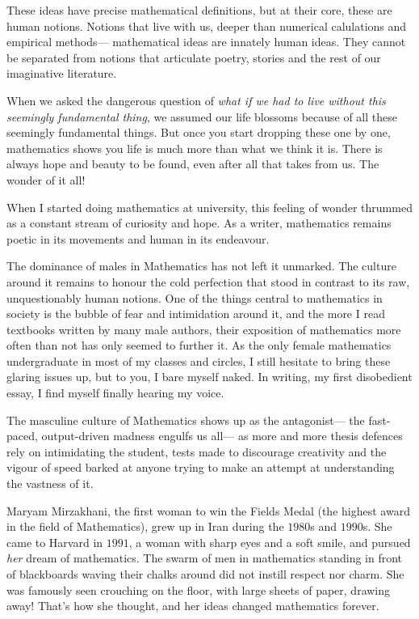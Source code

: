 \documentclass[11pt, letterpaper]{article}
\begin{document}
These ideas have precise mathematical definitions, but at their core, these are human notions. Notions that live with us, deeper than numerical calulations and empirical methods--- mathematical ideas are innately human ideas. They cannot be separated from notions that articulate poetry, stories and the rest of our imaginative literature. 

When we asked the dangerous question of \textit{what if we had to live without this seemingly fundamental thing}, we assumed our life blossoms because of all these seemingly fundamental things. But once you start dropping these one by one, mathematics shows you life is much more than what we think it is. There is always hope and beauty to be found, even after all that takes from us. The wonder of it all!

When I started doing mathematics at university, this feeling of wonder thrummed as a constant stream of curiosity and hope. As a writer, mathematics remains poetic in its movements and human in its endeavour. 

The dominance of males in Mathematics has not left it unmarked. The culture around it remains to honour the cold perfection that stood in contrast to its raw, unquestionably human notions. One of the things central to mathematics in society is the bubble of fear and intimidation around it, and the more I read textbooks written by many male authors, their exposition of mathematics more often than not has only seemed to further it. As the only female mathematics undergraduate in most of my classes and circles, I still hesitate to bring these glaring issues up, but to you, I bare myself naked. In writing, my first disobedient essay, I find myself finally hearing my voice.

The masculine culture of Mathematics shows up as the antagonist--- the fast-paced, output-driven madness engulfs us all--- as more and more thesis defences rely on intimidating the student, tests made to discourage creativity and the vigour of speed barked at anyone trying to make an attempt at understanding the vastness of it.

Maryam Mirzakhani, the first woman to win the Fields Medal (the highest award in the field of Mathematics), grew up in Iran during the $1980$s and $1990$s. She came to Harvard in $1991$, a woman with sharp eyes and a soft smile, and pursued \textit{her} dream of mathematics. The swarm of men in mathematics standing in front of blackboards waving their chalks around did not instill respect nor charm. She was famously seen crouching on the floor, with large sheets of paper, drawing away! That's how she thought, and her ideas changed mathematics forever. 
\end{document}
